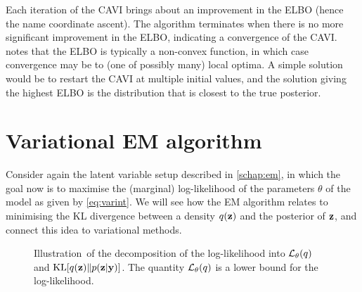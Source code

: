 Each iteration of the CAVI brings about an improvement in the ELBO (hence the name coordinate ascent).
The algorithm terminates when there is no more significant improvement in the ELBO, indicating a convergence of the CAVI.
\citet{blei2017variational} notes that the ELBO is typically a non-convex function, in which case convergence may be to (one of possibly many) local optima.
A simple solution would be to restart the CAVI at multiple initial values, and the solution giving the highest ELBO is the distribution that is closest to the true posterior.

\section{Variational EM algorithm}
\label{sec:varEM}


Consider again the latent variable setup described in \cref{schap:em}, in which the goal now is to maximise the (marginal) log-likelihood of the parameters $\theta$ of the model as given by \cref{eq:varint}.
We will see how the EM algorithm relates to minimising the KL divergence between a density $q({\mathbf z})$ and the posterior of ${\mathbf z}$, and connect this idea to variational methods.

\begin{figure}[htb]
  \centering
  \energyem 
  \caption[Illustration of the decomposition of the log likelihood.]{Illustration\footnotemark~of the decomposition of the log-likelihood into ${\mathcal L}_\theta(q)$ and $\operatorname{KL}[q({\mathbf z}) \Vert p({\mathbf z}|{\mathbf y})]$. The quantity ${\mathcal L}_\theta(q)$ is a lower bound for the log-likelihood.}
  \label{fig:loglikdecomp}
\end{figure}

